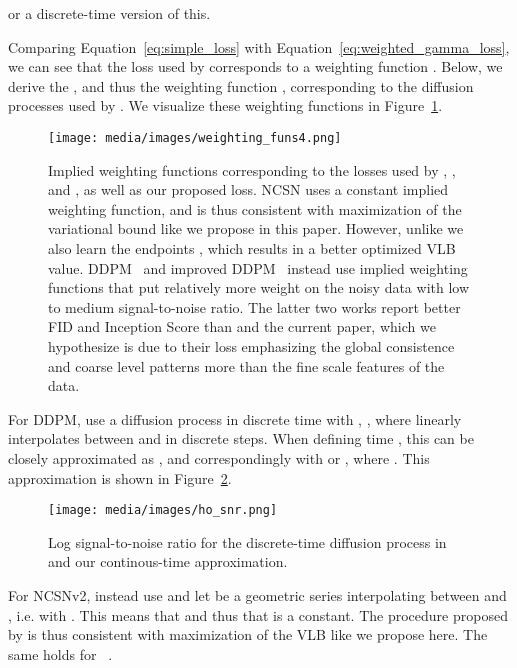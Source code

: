 \documentclass{article}
\def\Eqref#1{Equation~\ref{#1}}
\begin{document}
or a discrete-time version of this.

Comparing \Eqref{eq:simple_loss}
with \Eqref{eq:weighted_gamma_loss}, we can see that the loss used by \cite{ho2020denoising,song2019generative,nichol2021improved} corresponds to a weighting function . Below, we derive the , and thus the weighting function , corresponding to the diffusion processes used by \cite{ho2020denoising,song2019generative,nichol2021improved}. We visualize these weighting functions in Figure~\ref{fig:weighting_funs}.
\begin{figure}[htb]
    \centering
    \texttt{[image: media/images/weighting\_funs4.png]}
    \caption{Implied weighting functions corresponding to the losses used by \cite{ho2020denoising}, \cite{song2020denoising}, and \cite{nichol2021improved}, as well as our proposed loss. NCSN \citep{song2020denoising} uses a constant implied weighting function, and is thus consistent with maximization of the variational bound like we propose in this paper. However, unlike \cite{song2019generative} we also learn the endpoints , which results in a better optimized VLB value. DDPM~\citep{ho2020denoising} and improved DDPM~\citep{nichol2021improved} instead use implied weighting functions that put relatively more weight on the noisy data with low to medium signal-to-noise ratio. The latter two works report better FID and Inception Score than \cite{song2020denoising} and the current paper, which we hypothesize is due to their loss emphasizing the global consistence and coarse level patterns more than the fine scale features of the data.}
    \label{fig:weighting_funs}
\end{figure}

For DDPM, \cite{ho2020denoising} use a diffusion process in discrete time with , , where  linearly interpolates between  and  in  discrete steps. When defining time , this can be closely approximated as , and correspondingly with  or , where . This approximation is shown in Figure~\ref{fig:ho_snr}.
\begin{figure}[htb]
    \centering
    \texttt{[image: media/images/ho\_snr.png]}
    \caption{Log signal-to-noise ratio for the discrete-time diffusion process in \cite{ho2020denoising} and our continous-time approximation.}
    \label{fig:ho_snr}
\end{figure}

For NCSNv2, \cite{song2020improved} instead use  and let  be a geometric series interpolating between  and , i.e.  with . This means that  and thus that  is a constant. The procedure proposed by \cite{song2020improved} is thus consistent with maximization of the VLB like we propose here. The same holds for ~\citep{song2019generative}.
\end{document}
